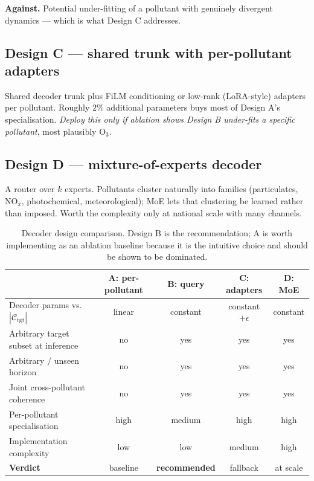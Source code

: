 \documentclass[11pt,a4paper]{article}
\newcommand{\Cset}{\mathcal{C}}
\begin{document}
\textbf{Against.} Potential under-fitting of a pollutant with genuinely divergent
dynamics --- which is what Design C addresses.

\subsection{Design C --- shared trunk with per-pollutant adapters}

Shared decoder trunk plus FiLM conditioning or low-rank (LoRA-style) adapters per
pollutant. Roughly $2\%$ additional parameters buys most of Design A's
specialisation. \emph{Deploy this only if ablation shows Design B under-fits a
specific pollutant}, most plausibly O$_3$.

\subsection{Design D --- mixture-of-experts decoder}

A router over $k$ experts. Pollutants cluster naturally into families
(particulates, NO$_x$, photochemical, meteorological); MoE lets that clustering be
learned rather than imposed. Worth the complexity only at national scale with
many channels.

\begin{table}[h]
\centering
\small
\begin{tabular}{@{}lcccc@{}}
\toprule
& A: per-pollutant & B: query & C: adapters & D: MoE \\
\midrule
Decoder params vs.\ $|\Cset_{\text{tgt}}|$ & linear & constant & constant$+\epsilon$ & constant \\
Arbitrary target subset at inference & no & yes & yes & yes \\
Arbitrary / unseen horizon & no & yes & yes & yes \\
Joint cross-pollutant coherence & no & yes & yes & yes \\
Per-pollutant specialisation & high & medium & high & high \\
Implementation complexity & low & low & medium & high \\
\midrule
\textbf{Verdict} & baseline & \textbf{recommended} & fallback & at scale \\
\bottomrule
\end{tabular}
\caption{Decoder design comparison. Design B is the recommendation; A is worth
implementing as an ablation baseline because it is the intuitive choice and
should be shown to be dominated.}
\end{table}
\end{document}
